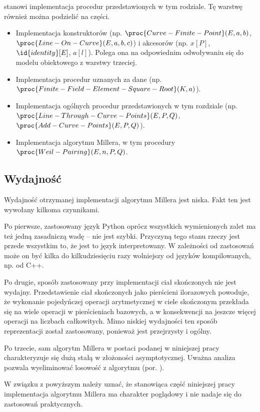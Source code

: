 \begin{enumerate}
stanowi implementacja procedur przedstawionych w tym rodziale.
Tę warstwę również można podzielić na części.
\begin{itemize}
\item
Implementacja konstruktorów
(np. $\proc{Curve-Finite-Point}(E, a, b)$, $\proc{Line-On-Curve}(E, a, b, c)$)
i akcesorów (np. $x[P]$, $\id{identity}[E]$, $a[l]$).
Polega ona na odpowiednim odwoływaniu się
do modelu obiektowego z warstwy trzeciej.
\item
Implementacja procedur uznanych za dane
(np. $\proc{Finite-Field-Element-Square-Root}(K, a)$).
\item
Implementacja ogólnych procedur przedstawionych w tym rozdziale
(np. $\proc{Line-Through-Curve-Points}(E, P, Q)$,
$\proc{Add-Curve-Points}(E, P, Q)$).
\item
Implementacja algorytmu Millera,
w tym procedury $\proc{Weil-Pairing}(E, n, P, Q)$.
\end{itemize}
\end{enumerate}

\subsection*{Wydajność}

Wydajność otrzymanej implementacji algorytmu Millera jest niska.
Fakt ten jest wywołany kilkoma czynnikami.

Po pierwsze, zastosowany język Python oprócz wszystkich wymienionych zalet
ma też jedną zasadniczą wadę -- nie jest szybki.
Przyczyną tego stanu rzeczy jest przede wszystkim to,
że jest to język interpretowany.
W zależności od zastosowań może on być kilka do kilkudziesięciu razy
wolniejszy od języków kompilowanych, np. od C++.

Po drugie, sposób zastosowany przy implementacji ciał skończonych
nie jest wydajny.
Przedstawienie ciał skończonych jako pierścieni ilorazowych powoduje,
że wykonanie pojedyńczej operacji arytmetycznej w ciele skończonym
przekłada się na wiele operacji w pierścieniach bazowych,
a w konsekwencji na jeszcze więcej operacji na liczbach całkowitych.
Mimo niskiej wydajności ten sposób reprezentacji został zastosowany,
ponieważ jest przejrzysty i ogólny.

Po trzecie, sam algorytm Millera w postaci podanej w niniejszej pracy
charakteryzuje się dużą stałą w złożoności asymptotycznej.
Uważna analiza pozwala wyeliminować losowość z algorytmu (por. \cite{miller}).

W związku z powyższym należy uznać, że stanowiąca część niniejszej pracy
implementacja algorytmu Millera ma charakter poglądowy
i nie nadaje się do zastosowań praktycznych.

